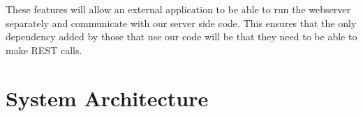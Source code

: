 These features will allow an external application to be able to run the webserver separately and communicate with our server side code. This ensures that the only dependency added by those that use our code will be that they need to be able to make \gls{REST} calls.

\section{System Architecture}


